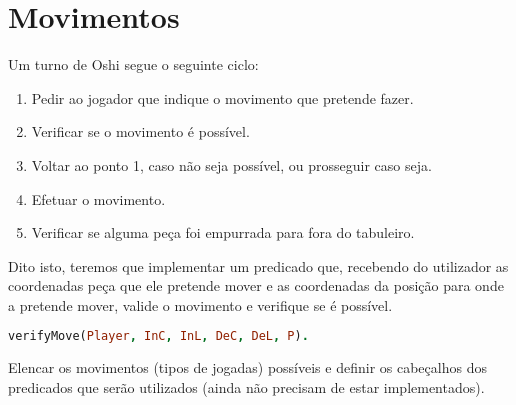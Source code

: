 \documentclass[a4paper]{article}
\begin{document}
\clearpage

\section{Movimentos}

Um turno de Oshi segue o seguinte ciclo:

\begin{enumerate}
	\item Pedir ao jogador que indique o movimento que pretende fazer.
	\item Verificar se o movimento é possível.
	\item Voltar ao ponto 1, caso não seja possível, ou prosseguir caso seja.
	\item Efetuar o movimento.
	\item Verificar se alguma peça foi empurrada para fora do tabuleiro.
\end{enumerate}

Dito isto, teremos que implementar um predicado que, recebendo do utilizador as coordenadas peça que ele pretende mover e as coordenadas da posição para onde a pretende mover, valide o movimento e verifique se é possível.
\bigskip
\begin{lstlisting}[language=Prolog]
verifyMove(Player, InC, InL, DeC, DeL, P).
\end{lstlisting}
\bigskip


Elencar os movimentos (tipos de jogadas) possíveis e definir os cabeçalhos dos predicados que serão utilizados (ainda não precisam de estar implementados).
\end{document}
